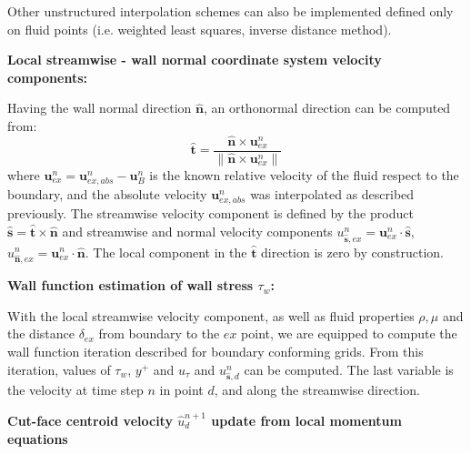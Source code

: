 \documentclass[12pt]{article}
\begin{document}
Other unstructured interpolation schemes can also be implemented defined only on fluid points (i.e. weighted least squares, inverse distance method).


\bigskip
\noindent
\textbf{Local streamwise - wall normal coordinate system velocity components:}
\bigskip

Having the wall normal direction $\hat{\mathbf{n}}$, an orthonormal direction can be computed from:
%
\begin{equation}
    \hat{\mathbf{t}} = \frac{\hat{\mathbf{n}} \times \mathbf{u}_{ex}^n}{\| \hat{\mathbf{n}} \times \mathbf{u}_{ex}^n \| }
\end{equation}
%
where $\mathbf{u}_{ex}^n=\mathbf{u}_{ex,abs}^n-\mathbf{u}_{B}^n$ is the known relative velocity of the fluid respect to the boundary, and the absolute velocity $\mathbf{u}_{ex,abs}^n$ was interpolated as described previously.
The streamwise velocity component is defined by the product $\hat{\mathbf{s}} = \hat{\mathbf{t}} \times \hat{\mathbf{n}}$ and streamwise and normal velocity components  $u_{\hat{\mathbf{s}},ex}^n= \mathbf{u}_{ex}^n \cdot \hat{\mathbf{s}}$, $u_{\hat{\mathbf{n}},ex}^n= \mathbf{u}_{ex}^n \cdot \hat{\mathbf{n}}$. The local component in the $\hat{\mathbf{t}}$ direction is zero by construction.

\bigskip
\noindent
\textbf{Wall function estimation of wall stress $\tau_w$:}

With the local streamwise velocity component, as well as fluid properties $\rho, \mu$ and the distance $\delta_{ex}$ from boundary to the $ex$ point, we are equipped to compute the wall function iteration described for boundary conforming grids. From this iteration, values of $\tau_w$, $y^+$ and $u_\tau$ and $u_{\hat{\mathbf{s}},d}^n$ can be computed. The last variable is the velocity at time step $n$ in point $d$, and along the streamwise direction.

\bigskip
\noindent
\textbf{Cut-face centroid velocity $\hat{u}_d^{n+1}$ update from local momentum equations}
\bigskip
\end{document}
